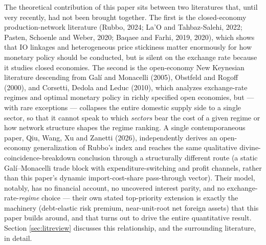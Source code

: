 \documentclass[12pt]{article}
\begin{document}
The theoretical contribution of this paper sits between two literatures that, until very recently,
had not been brought together. The first is the closed-economy production-network literature
(Rubbo, 2024; La'O and Tahbaz-Salehi, 2022; Pasten, Schoenle and Weber, 2020; Baqaee and Farhi, 2019,
2020), which shows that IO linkages and heterogeneous price stickiness matter enormously for how
monetary policy should be conducted, but is silent on the exchange rate because it studies closed
economies. The second is the open-economy New Keynesian literature descending from Gal\'i and
Monacelli (2005), Obstfeld and Rogoff (2000), and Corsetti, Dedola and Leduc (2010), which analyzes
exchange-rate regimes and optimal monetary policy in richly specified open economies, but --- with
rare exceptions --- collapses the entire domestic supply side to a single sector, so that it cannot
speak to which \emph{sectors} bear the cost of a given regime or how network structure shapes the
regime ranking. A single contemporaneous paper, Qiu, Wang, Xu and Zanetti (2026), independently
derives an open-economy generalization of Rubbo's index and reaches the same qualitative
divine-coincidence-breakdown conclusion through a structurally different route (a static
Gal\'i--Monacelli trade block with expenditure-switching and profit channels, rather than this
paper's dynamic import-cost-share pass-through vector). Their model, notably, has no financial
account, no uncovered interest parity, and no exchange-rate-\emph{regime} choice --- their own stated
top-priority extension is exactly the machinery (debt-elastic risk premium, near-unit-root net
foreign assets) that this paper builds around, and that turns out to drive the entire quantitative
result. Section \ref{sec:litreview} discusses this relationship, and the surrounding literature, in
detail.
\end{document}
